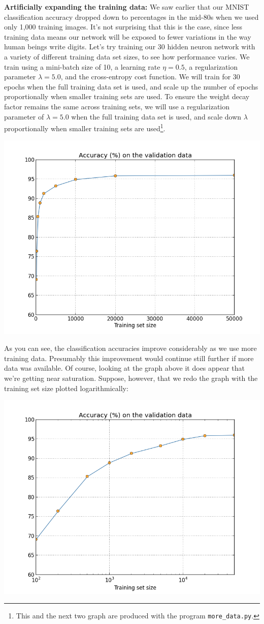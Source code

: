 \documentclass[a4paper,twoside,10pt]{book}
\begin{document}
\textbf{Artificially expanding the training data:} We saw earlier that our MNIST classification accuracy dropped down to percentages in the mid-80s when we used only 1,000 training images. It's not surprising that this is the case, since less training data means our network will be exposed to fewer variations in the way human beings write digits. Let's try training our 30 hidden neuron network with a variety of different training data set sizes, to see how performance varies. We train using a mini-batch size of 10, a learning rate $\eta=0.5$, a regularization parameter $\lambda=5.0$, and the cross-entropy cost function. We will train for 30 epochs when the full training data set is used, and scale up the number of epochs proportionally when smaller training sets are used. To ensure the weight decay factor remains the same across training sets, we will use a regularization parameter of $\lambda=5.0$ when the full training data set is used, and scale down $\lambda$ proportionally when smaller training sets are used\footnote{This and the next two graph are produced with the program \texttt{more\_data.py}.}.
\begin{center}
	\includegraphics[width=0.7\linewidth]{figures/ch3/more_data}
\end{center}
As you can see, the classification accuracies improve considerably as we use more training data. Presumably this improvement would continue still further if more data was available. Of course, looking at the graph above it does appear that we're getting near saturation. Suppose, however, that we redo the graph with the training set size plotted logarithmically:
\begin{center}
	\includegraphics[width=0.7\linewidth]{figures/ch3/more_data_log}
\end{center}
\end{document}
